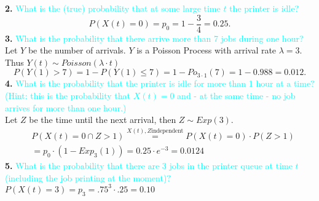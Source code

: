 \documentclass[20pt,landscape]{foils}
\newcommand{\no}{\noindent}
\begin{document}
\no \textbf{2.}   {\textcolor{cyan}{What is the (true) probability that at some large time $t$ the printer is idle?}} 
\[
P(X(t) = 0) = p_0 = 1 - \frac{3}{4} = 0.25.
\]
\no \textbf{3.}   {\textcolor{cyan}{What is the probability that there arrive more than 7 jobs during one hour?}}\\[.1in]
\no Let $Y$ be the number of arrivals. $Y$ is a Poisson Process with arrival rate $\lambda = 3$. Thus  $Y(t) \sim Poisson(\lambda \cdot t)$
$$P(Y(1) > 7 ) = 1 - P(Y(1) \le 7) = 1 - Po_{3 \cdot 1} (7) = 1 - 0.988 = 0.012.$$ 
\newpage
\no \textbf{4.}  {\textcolor{cyan}{What is the probability that the printer is idle for more than 1 hour at a time? (Hint: this is the probability that $X(t) = 0$ and - at the same time - no job arrives for more than one hour.)}}\\[.1in]
Let $Z$ be the time until the next arrival, then  $Z \sim Exp(3)$.\\[-.3in]
\begin{align*}
&P( X(t) = 0 \cap Z > 1) \stackrel{X(t), Z \text{independent}}{=} P( X(t) = 0) \cdot P(Z > 1)\\
 &= p_0 \cdot (1 - Exp_3 (1)) = 0.25 \cdot e^{-3} = 0.0124
\end{align*}
\no \textbf{5.}  {\textcolor{cyan}{What is the probability that there are 3 jobs in the printer queue at time $t$ (including the job printing at the moment)?}}\\[.1in]
\no \hspace*{2in} $P(X(t) = 3) = p_3 = .75^3 \cdot .25 = 0.10$\\[.1in]
\end{document}
